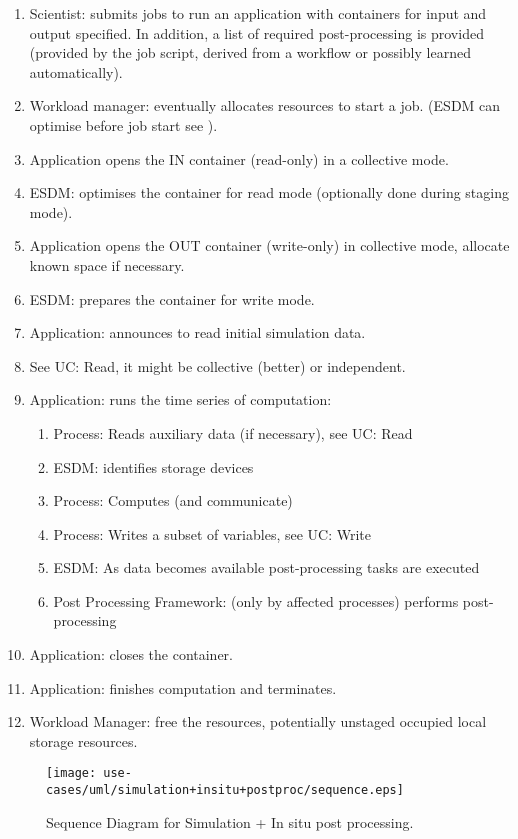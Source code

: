 \begin{enumerate}
	\item Scientist: submits jobs to run an application with containers for input and output specified. In addition, a list of required post-processing is provided (provided by the job script, derived from a workflow or possibly learned automatically).
	\item Workload manager: eventually allocates resources to start a job. (ESDM can optimise before job start see ).
	\item Application opens the IN container (read-only) in a collective mode.
	\item ESDM: optimises the container for read mode (optionally done during staging mode).
	\item Application opens the OUT container (write-only) in collective mode, allocate known space if necessary.
	\item ESDM: prepares the container for write mode.
	\item Application: announces to read initial simulation data.
	\item See UC: Read, it might be collective (better) or independent.
	\item Application: runs the time series of computation:
	\begin{enumerate}
		\item Process: Reads auxiliary data (if necessary), see UC: Read
		\item ESDM: identifies storage devices
		\item Process: Computes (and communicate)
		\item Process: Writes a subset of variables, see UC: Write
		\item ESDM: As data becomes available post-processing tasks are executed
		\item Post Processing Framework: (only by affected processes) performs post-processing
	\end{enumerate}
	\item Application: closes the container.
	\item Application: finishes computation and terminates.
	\item Workload Manager: free the resources, potentially unstaged occupied local storage resources.
\end{enumerate}


\begin{figure}
	\centering
	\texttt{[image: use-cases/uml/simulation+insitu+postproc/sequence.eps]}
	\caption{Sequence Diagram for Simulation + In situ post processing.}
	\label{fig:sequence in-situ}
\end{figure}




